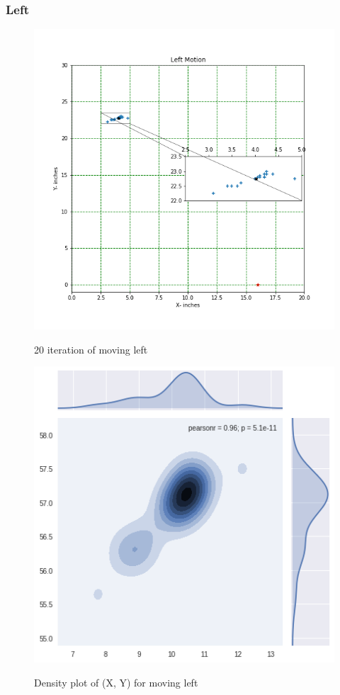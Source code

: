 \documentclass[11pt,a4paper]{article}
\begin{document}
\begin{itemize}
\subsubsection{Left}
\begin{figure}[H]
\centering	
\includegraphics[width=1.2\linewidth]{left}
\label{fig:sub1}
\caption{20 iteration of moving left}
\end{figure}

\begin{figure}[H]
\centering	
\includegraphics[width=1.0\linewidth]{leftG}
\label{fig:sub1}
\caption{Density plot of (X, Y) for moving left}
\end{figure}


\end{itemize}
\end{document}
